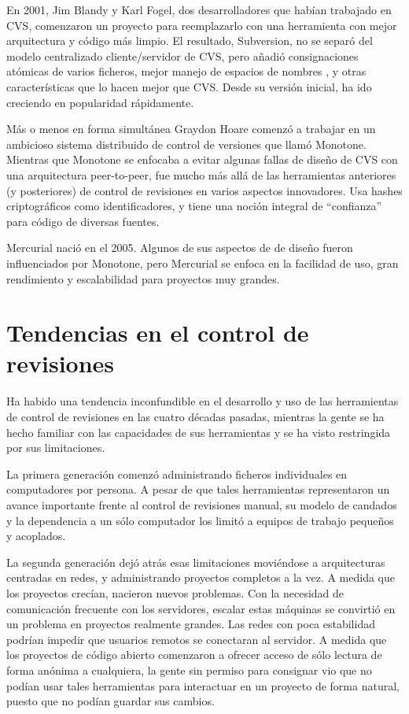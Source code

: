 En 2001, Jim Blandy y Karl Fogel, dos desarrolladores que habían
trabajado en CVS, comenzaron un proyecto para reemplazarlo con una
herramienta con mejor arquitectura y código más limpio.  El resultado,
Subversion, no se separó del modelo centralizado cliente/servidor de
CVS, pero añadió consignaciones atómicas de varios ficheros, mejor
manejo de espacios de nombres , y otras características que lo hacen
mejor que CVS. Desde su versión inicial, ha ido creciendo en
popularidad rápidamente.

Más o menos en forma simultánea Graydon Hoare comenzó a trabajar en un
ambicioso sistema distribuido de control de versiones que llamó
Monotone. Mientras que Monotone se enfocaba a evitar algunas fallas de
diseño de CVS con una arquitectura peer-to-peer, fue mucho más
allá de las herramientas anteriores (y posteriores) de
control de revisiones en varios aspectos innovadores. Usa hashes
criptográficos como identificadores, y tiene una noción integral de 
``confianza'' para código de diversas fuentes.

Mercurial nació en el 2005.  Algunos de sus aspectos de de diseño
fueron influenciados por Monotone, pero Mercurial se enfoca en la
facilidad de uso, gran rendimiento y escalabilidad para proyectos muy
grandes.

\section{Tendencias en el control de revisiones}

Ha habido una tendencia inconfundible en el desarrollo y uso de las herramientas
de control de revisiones en las cuatro décadas pasadas, mientras la
gente se ha hecho familiar con las capacidades de sus herramientas y
se ha visto restringida por sus limitaciones.

La primera generación comenzó administrando ficheros individuales en
computadores por persona. A pesar de que tales herramientas
representaron un avance importante frente al control de revisiones
manual, su modelo de candados y la dependencia a un sólo computador
los limitó a equipos de trabajo pequeños y acoplados.

La segunda generación dejó atrás esas limitaciones moviéndose a
arquitecturas centradas en  redes, y administrando proyectos completos
a la vez. A medida que los proyectos crecían, nacieron nuevos
problemas. Con la necesidad de comunicación frecuente con los
servidores, escalar estas máquinas se convirtió en un problema en
proyectos realmente grandes. Las redes con poca estabilidad podrían
impedir que usuarios remotos se conectaran al servidor. A medida que
los
proyectos de código abierto comenzaron a ofrecer acceso de sólo lectura
de forma anónima a cualquiera, la gente sin permiso para consignar
vio que no podían usar tales herramientas para interactuar en un
proyecto de forma natural, puesto que no podían guardar sus cambios.

